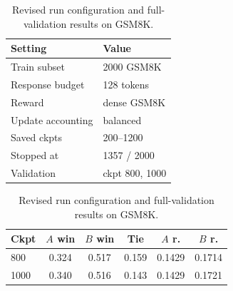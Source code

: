 \documentclass[10pt,a4paper]{article}
\newcommand{\newAWinEightHundred}{0.324}
\newcommand{\newBWinEightHundred}{0.517}
\newcommand{\newTieEightHundred}{0.159}
\newcommand{\newARewardEightHundred}{0.1429}
\newcommand{\newBRewardEightHundred}{0.1714}
\newcommand{\newAWinThousand}{0.340}
\newcommand{\newBWinThousand}{0.516}
\newcommand{\newTieThousand}{0.143}
\newcommand{\newARewardThousand}{0.1429}
\newcommand{\newBRewardThousand}{0.1721}
\begin{document}
\begin{table}[H]
\centering
\scriptsize
\begin{minipage}[t]{0.46\linewidth}
\centering
\begin{tabular}{@{}ll@{}}
\toprule
Setting & Value \\
\midrule
Train subset & 2000 GSM8K \\
Response budget & 128 tokens \\
Reward & dense GSM8K \\
Update accounting & balanced \\
Saved ckpts & 200--1200 \\
Stopped at & 1357 / 2000 \\
Validation & ckpt 800, 1000 \\
\bottomrule
\end{tabular}
\end{minipage}\hfill
\begin{minipage}[t]{0.50\linewidth}
\centering
\begin{tabular}{@{}lccccc@{}}
\toprule
Ckpt & $A$ win & $B$ win & Tie & $A$ r. & $B$ r. \\
\midrule
800  & \newAWinEightHundred & \newBWinEightHundred & \newTieEightHundred & \newARewardEightHundred & \newBRewardEightHundred \\
1000 & \newAWinThousand     & \newBWinThousand     & \newTieThousand     & \newARewardThousand     & \newBRewardThousand \\
\bottomrule
\end{tabular}
\end{minipage}
\caption{Revised run configuration and full-validation results on GSM8K.}
\label{tab:newval}
\end{table}
\end{document}
